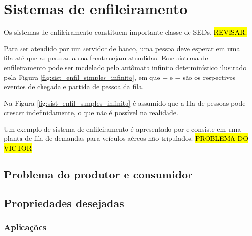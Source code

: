 \chapter{Sistemas de enfileiramento}

Os sistemas de enfileiramento constituem importante classe de \acs{SED}s. \hl{REVISAR.} \cite{cassandras}

Para ser atendido por um servidor de banco, uma pessoa deve esperar em uma fila até que as pessoas a sua frente sejam atendidas. Esse sistema de enfileiramento pode ser modelado pelo autômato infinito determinístico ilustrado pela Figura \ref{fig:sist_enfil_simples_infinito}, em que $+$ e $-$ são os respectivos eventos de chegada e partida de pessoa da fila.


Na Figura \ref{fig:sist_enfil_simples_infinito} é assumido que a fila de pessoas pode crescer indefinidamente, o que não é possível na realidade.

Um exemplo de sistema de enfileiramento é apresentado por  e consiste em uma planta de fila de demandas para veículos aéreos não tripulados. \hl{PROBLEMA DO VICTOR}

\section{Problema do produtor e consumidor}

\section{Propriedades desejadas}

\subsection{Aplicações}
